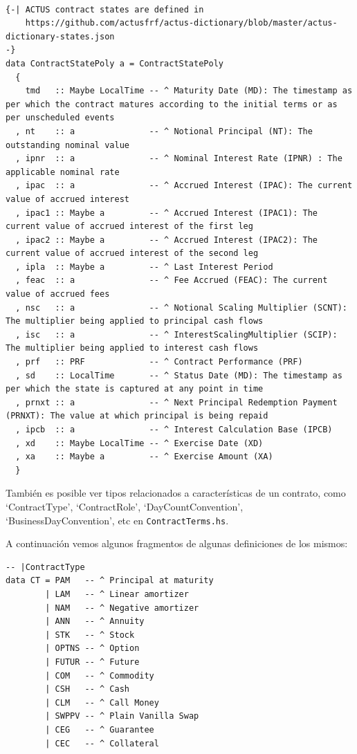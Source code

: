 \documentclass[12pt]{book}
\begin{document}
\begin{lstlisting}[style=Haskell-cardano, caption=Contract state poly.]

{-| ACTUS contract states are defined in
    https://github.com/actusfrf/actus-dictionary/blob/master/actus-dictionary-states.json
-}
data ContractStatePoly a = ContractStatePoly
  {
    tmd   :: Maybe LocalTime -- ^ Maturity Date (MD): The timestamp as per which the contract matures according to the initial terms or as per unscheduled events
  , nt    :: a               -- ^ Notional Principal (NT): The outstanding nominal value
  , ipnr  :: a               -- ^ Nominal Interest Rate (IPNR) : The applicable nominal rate
  , ipac  :: a               -- ^ Accrued Interest (IPAC): The current value of accrued interest
  , ipac1 :: Maybe a         -- ^ Accrued Interest (IPAC1): The current value of accrued interest of the first leg
  , ipac2 :: Maybe a         -- ^ Accrued Interest (IPAC2): The current value of accrued interest of the second leg
  , ipla  :: Maybe a         -- ^ Last Interest Period
  , feac  :: a               -- ^ Fee Accrued (FEAC): The current value of accrued fees
  , nsc   :: a               -- ^ Notional Scaling Multiplier (SCNT): The multiplier being applied to principal cash flows
  , isc   :: a               -- ^ InterestScalingMultiplier (SCIP): The multiplier being applied to interest cash flows
  , prf   :: PRF             -- ^ Contract Performance (PRF)
  , sd    :: LocalTime       -- ^ Status Date (MD): The timestamp as per which the state is captured at any point in time
  , prnxt :: a               -- ^ Next Principal Redemption Payment (PRNXT): The value at which principal is being repaid
  , ipcb  :: a               -- ^ Interest Calculation Base (IPCB)
  , xd    :: Maybe LocalTime -- ^ Exercise Date (XD)
  , xa    :: Maybe a         -- ^ Exercise Amount (XA)
  }
\end{lstlisting}


También es posible ver tipos relacionados a características de un contrato, como `ContractType', `ContractRole', `DayCountConvention', `BusinessDayConvention', etc en \texttt{ContractTerms.hs}.

A continuación vemos algunos fragmentos de algunas definiciones de los mismos:

\begin{lstlisting}[style=Haskell-cardano, caption=Tipos de contrato.]
-- |ContractType
data CT = PAM   -- ^ Principal at maturity
        | LAM   -- ^ Linear amortizer
        | NAM   -- ^ Negative amortizer
        | ANN   -- ^ Annuity
        | STK   -- ^ Stock
        | OPTNS -- ^ Option
        | FUTUR -- ^ Future
        | COM   -- ^ Commodity
        | CSH   -- ^ Cash
        | CLM   -- ^ Call Money
        | SWPPV -- ^ Plain Vanilla Swap
        | CEG   -- ^ Guarantee
        | CEC   -- ^ Collateral
\end{lstlisting}
\end{document}
